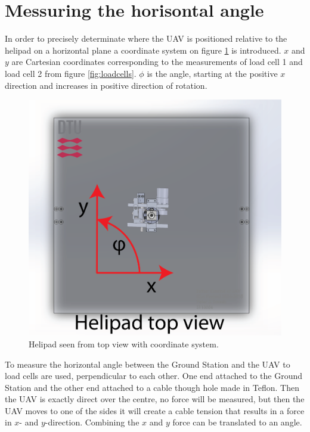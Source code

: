 \section{Messuring the horisontal angle}
\label{sec:horizontalAnglePrototype}
In order to precisely determinate where the UAV is positioned relative to the helipad on a horizontal plane a coordinate system on figure \ref{fig:top-coordinates} is introduced. $x$ and $y$ are Cartesian coordinates corresponding to the measurements of load cell 1 and load cell 2 from figure \ref{fig:loadcells}. $\phi$ is the angle, starting at the positive $x$ direction and increases in positive direction of rotation.

\begin{figure}[hbtp]
\centering
\includegraphics[scale=0.6]{graphics/cad/top-coordinates.png}
\caption{Helipad seen from top view with coordinate system.}
\label{fig:top-coordinates}
\end{figure}

\noindent
To measure the horizontal angle between the Ground Station and the UAV to load cells are used, perpendicular to each other. One end attached to the Ground Station and the other end attached to a cable though hole made in Teflon. Then the UAV is exactly direct over the centre, no force will be measured, but then the UAV moves to one of the sides it will create a cable tension that results in a force in $x$- and $y$-direction. Combining the $x$ and $y$ force can be translated to an angle. 

